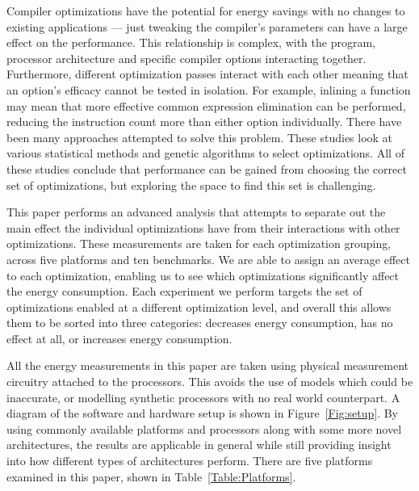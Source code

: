 \documentclass[twocolumn]{article}
\newcommand{\todo}[1]{\textbf{\textcolor{red}{#1}}}
\begin{document}

Compiler optimizations have the potential for energy savings with no changes to existing applications --- just tweaking the compiler's parameters can have a large effect on the performance. This relationship is complex, with the program, processor architecture and specific compiler options interacting together. Furthermore, different optimization passes interact with each other meaning that an option's efficacy cannot be tested in isolation. For example, inlining a function may mean that more effective common expression elimination can be performed, reducing the instruction count more than either option individually. There have been many approaches attempted to solve this problem\cite{Haneda2005, Lin2008, Triantafyllis}. These studies look at various statistical methods and genetic algorithms to select optimizations. All of these studies conclude that performance can be gained from choosing the correct set of optimizations, but exploring the space to find this set is challenging.

This paper performs an advanced analysis that attempts to separate out the main effect the individual optimizations have from their interactions with other optimizations. These measurements are taken for each optimization grouping, across five platforms and ten benchmarks. We are able to assign an average effect to each optimization, enabling us to see which optimizations significantly affect the energy consumption. Each experiment we perform targets the set of optimizations enabled at a different optimization level, and overall this allows them to be sorted into three categories: decreases energy consumption, has no effect at all, or increases energy consumption.

All the energy measurements in this paper are taken using physical measurement circuitry attached to the processors. This avoids the use of models which could be inaccurate, or modelling synthetic processors with no real world counterpart. A diagram of the software and hardware setup is shown in Figure~\ref{Fig:setup}. By using commonly available platforms and processors along with some more novel architectures, the results are applicable in general while still providing insight into how different types of architectures perform. There are five platforms examined in this paper, shown in Table~\ref{Table:Platforms}.
\end{document}
